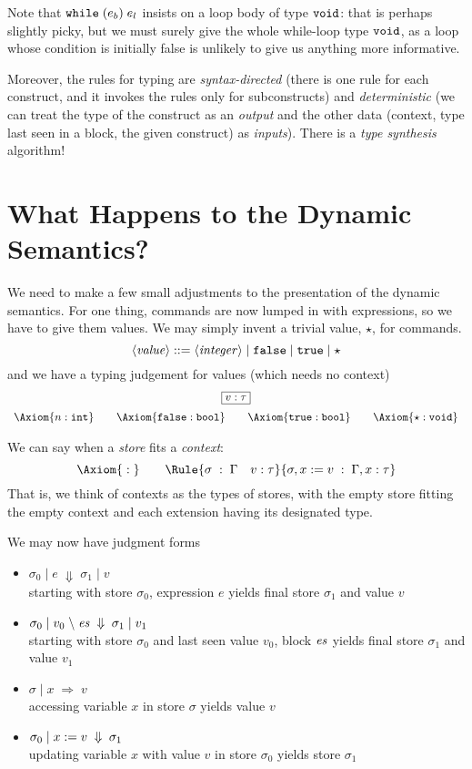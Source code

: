 \documentclass{article}
\begin{document}
Note that $\mathtt{while}\; \mathtt{(}e_b\mathtt{)} \;e_l$ insists on a loop body of type $\mathtt{void}$: that is perhaps slightly picky, but we must surely give the whole while-loop type $\mathtt{void}$, as a loop whose condition is initially false is unlikely to give us anything more
informative.

Moreover, the rules for typing are \emph{syntax-directed} (there is one rule for each construct, and it invokes the rules only for subconstructs) and \emph{deterministic} (we can treat the type of the construct as an \emph{output}
and the other data (context, type last seen in a block, the given construct)
as \emph{inputs}). There is a \emph{type synthesis} algorithm!


\section{What Happens to the Dynamic Semantics?}

\newcommand{\VT}[1]{\mathsf{typeof}(#1)}
\newcommand{\JEv}[4]{#1 \;|\; #2 \;\Downarrow\; #3 \;|\; #4} 
\newcommand{\JEvs}[5]{#1 \;|\; #2 \;\backslash\; #3 \;\Downarrow\; #4 \;|\; #5}
\newcommand{\JPll}[3]{#1 \;|\; #2 \;\Rightarrow\;#3} 
\newcommand{\JPla}[4]{#1 \;|\; #2\ass#3 \;\Downarrow\;#4} 
We need to make a few small adjustments to the presentation of the dynamic semantics. For one thing, commands are now lumped in with expressions, so
we have to give them values. We may simply invent a trivial value, $\star$, for
commands.
\[
  \langle \mathit{value} \rangle ::= \langle \mathit{integer} \rangle \;|\; \mathtt{false} \;|\; \mathtt{true} \;|\; \star
\]
and we have a typing judgement for values (which needs no context)
\[\begin{array}{c}
    \fbx{v : \tau} \medskip \\
    \Axiom{n : \intg} \qquad \Axiom{\false : \bool}\qquad \Axiom{\true : \bool}\qquad \Axiom{\star : \void}
\end{array}  \]

We can say when a \emph{store} fits a \emph{context}:
\[
  \Axiom{\;:\;} \qquad
  \Rule{\sigma \;:\;\Gamma\quad v:\tau}{\sigma,x:=v \;:\; \Gamma,x:\tau}
\]
That is, we think of contexts as the types of stores, with the empty store fitting the empty context and each extension having its designated type.

We may now have judgment forms
\begin{itemize}
\item $\JEv{\sigma_0}{e}{\sigma_1}{v}$\\
  starting with store $\sigma_0$, expression $e$ yields final store
  $\sigma_1$ and value $v$
\item $\JEvs{\sigma_0}{v_0}\es{\sigma_1}{v_1}$\\
  starting with store $\sigma_0$ and last seen value $v_0$, block
  $\mathit{es}$ yields final store $\sigma_1$ and value $v_1$
\item $\JPll\sigma xv$\\
  accessing variable $x$ in store $\sigma$ yields
  value $v$
\item $\JPla{\sigma_0}xv{\sigma_1}$\\
  updating variable $x$ with value $v$ in store $\sigma_0$ yields
  store $\sigma_1$
\end{itemize}
\end{document}
